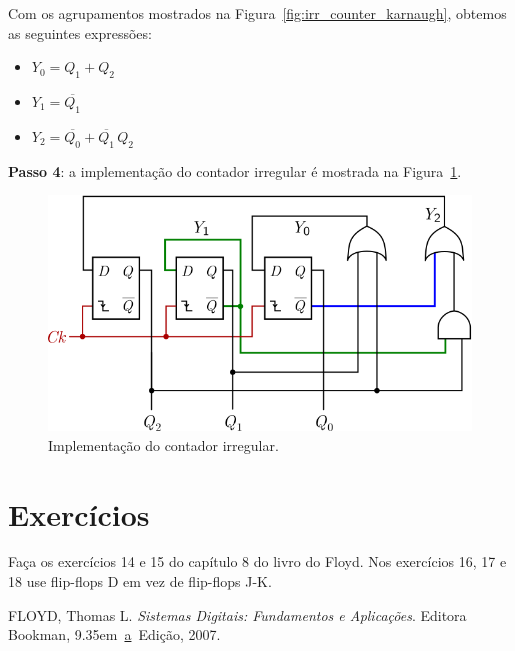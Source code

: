 \documentclass[a4paper]{article}
\def\ba{\mbox{\raise .35em \hbox{\underline{\scriptsize a}\ }}}
\newcommand{\Not}[1]{\overline{#1}}
\begin{document}
Com os agrupamentos mostrados na Figura~\ref{fig:irr_counter_karnaugh},
obtemos as seguintes expressões:
\begin{itemize}
\item $Y_0 = Q_1 + Q_2$
\item $Y_1 = \Not{Q_1}$
\item $Y_2 = \Not{Q_0} + \Not{Q_1} \, Q_2$
\end{itemize}

\textbf{Passo 4}: a implementação do contador irregular é
mostrada na Figura~\ref{fig:irr_counter_circuit}.

\begin{figure}[!htp]
\begin{center}
\includegraphics{images/irr_counter_circuit}
\caption{Implementação do contador irregular.}
\label{fig:irr_counter_circuit}
\end{center}
\end{figure}

\section{Exercícios}

Faça os exercícios 14 e 15 do capítulo 8 do livro do Floyd.
Nos exercícios 16, 17 e 18 use flip-flops D em vez de flip-flops J-K.

\begin{thebibliography}{9}
  FLOYD, Thomas L.
  \emph{Sistemas Digitais: Fundamentos e Aplicações}.
  Editora Bookman,
  9\ba Edição,
  2007.
\end{thebibliography}
\end{document}
